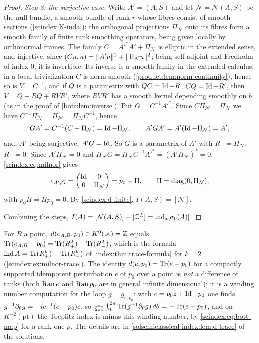 \begin{proof}
  \emph{Step 3: the surjective case.} Write $A'=(A,S)$ and let
  $\mathcal N=\mathcal N(A,S)$ be the null bundle, a smooth bundle of rank $r$
  whose fibres consist of smooth sections (\ref{scindex:K-inda}); the orthogonal
  projections $\Pi_{\mathcal N}$ onto its fibres form a smooth family of finite
  rank smoothing operators, being given locally by orthonormal frames. The
  family $C=A'^*A'+\Pi_{\mathcal N}$ is elliptic in the extended sense, and
  injective, since $( Cu, u)=\lVert A'u\rVert^2+\lVert \Pi_{\mathcal N}u\rVert^2$; being
  self-adjoint and Fredholm of index $0$, it is invertible. Its inverse is a smooth
  family in the extended calculus: in a local trivialization $C$ is norm-smooth
  (\cref{product:lem:norm-continuity}), hence so is $V=C^{-1}$, and if $Q$ is a parametrix with
  $QC=\operatorname{Id}-R$, $CQ=\operatorname{Id}-R'$, then $V=Q+RQ+RVR'$, where $RVR'$ has a smooth kernel
  depending smoothly on $b$ (as in the proof of \cref{bott:lem:inverse}). Put $G=C^{-1}A'^*$. Since
  $C\Pi_{\mathcal N}=\Pi_{\mathcal N}$ we have $C^{-1}\Pi_{\mathcal N}=
  \Pi_{\mathcal N}=\Pi_{\mathcal N}C^{-1}$, hence
  \begin{equation*}
    GA'=C^{-1}(C-\Pi_{\mathcal N})=\operatorname{Id}-\Pi_{\mathcal N},\qquad
    A'GA'=A'(\operatorname{Id}-\Pi_{\mathcal N})=A',
  \end{equation*}
  and, $A'$ being surjective, $A'G=\operatorname{Id}$. So $G$ is a parametrix of $A'$ with
  $R_+=\Pi_{\mathcal N}$, $R_-=0$. Since $A'\Pi_{\mathcal N}=0$ and
  $\Pi_{\mathcal N}G=\Pi_{\mathcal N}C^{-1}A'^*=(A'\Pi_{\mathcal N})^*=0$,
  \eqref{scindex:eq:milnor} gives
  \begin{equation*}
    e_{A',G}=\begin{pmatrix}\operatorname{Id}&0\\0&\Pi_{\mathcal N}\end{pmatrix}=p_0+
    \Pi,\qquad\Pi=\operatorname{diag}(0,\Pi_{\mathcal N}),
  \end{equation*}
  with $p_0\Pi=\Pi p_0=0$. By \ref{scindex:d-finite}, $I(A,S)=[\mathcal N]$.

  Combining the steps, $I(A)=[\mathcal N(A,S)]-[\mathbb{C}^L]=\operatorname{ind}_{\mathrm{a}}[\sigma_0(A)]$.
\end{proof}

\begin{remark}\label{scindex:rem:index-trace}
  For $B$ a point, $d(e_{A,B},p_0)\in K^0(\mathrm{pt})=\mathbb{Z}$ equals
  $\operatorname{Tr}(e_{A,B}-p_0)=\operatorname{Tr}(R_+^2)-\operatorname{Tr}(R_-^2)$, which is the formula
  $\operatorname{ind} A=\operatorname{Tr}(R_+^k)-\operatorname{Tr}(R_-^k)$ of \cref{index:thm:trace-formula} for $k=2$
  (\cref{scindex:ex:milnor-trace}). The identity $d(e,p_0)=\operatorname{Tr}(e-p_0)$ for a
  compactly supported idempotent perturbation $e$ of $p_0$ over a point is
  \emph{not} a difference of ranks (both $\operatorname{Ran} e$ and $\operatorname{Ran} p_0$ are in general
  infinite dimensional); it is a winding number computation for the loop
  $g=g_{e,p_0}$: with $c=p_0z+\operatorname{Id}-p_0$ one finds $g^{-1}\partial_\theta g=
  -ic^{-1}(e-p_0)c$, so $\frac1{2\pi i}\int_0^{2\pi}\operatorname{Tr}(g^{-1}\partial_\theta g)\,
  d\theta=-\operatorname{Tr}(e-p_0)$, and on $K^{-2}(\mathrm{pt})$ the Toeplitz index is minus
  this winding number, by \eqref{scindex:eq:bott-map} for a rank one $p$. The
  details are in \cref{solsemiclassical-index:lem:d-trace} of the solutions.
\end{remark}

